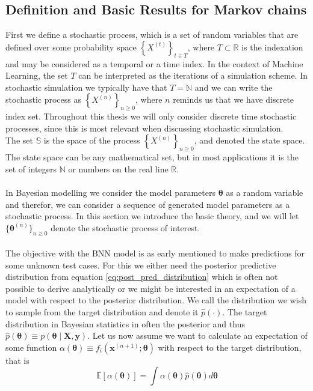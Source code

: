 \subsection{Definition and Basic Results for Markov chains}
First we define a stochastic process, which is a set of random variables that are defined over some probability space $\left\{X^{(t)} \right\}_{t\in T}$, where $T\subset \mathbb{R}$ is the indexation and may be considered as a temporal or a time index. In the context of Machine Learning, the set $T$ can be interpreted as the iterations of a simulation scheme. In stochastic simulation we typically have that $T=\mathbb{N}$ and we can write the stochastic process as $\left\{X^{(n)}\right\}_{n\geq 0}$, where $n$ reminds us that we have discrete index set. Throughout this thesis we will only consider discrete time stochastic processes, since this is most relevant when discussing stochastic simulation. \\
The set $\mathbb{S}$ is the space of the process $\left\{X^{(n)} \right\}_{n\geq 0}$, and denoted the state space. The state space can be any mathematical set, but in most applications it is the set of integers $\mathbb{N}$ or numbers on the real line $\mathbb{R}$.\\
\\
In Bayesian modelling we consider the model parameters $\boldsymbol{\theta}$ as a random variable and therefor, we can consider a sequence of generated model parameters as a stochastic process. In this section we introduce the basic theory, and we will let $\{\boldsymbol{\theta}^{(n)}\}_{n\geq 0}$ denote the stochastic process of interest.\\ \\
The objective with the BNN model is as early mentioned to make predictions for some unknown test cases. For this we either need the posterior predictive distribution from equation \ref{eq:post_pred_distribution} which is often not possible to derive analytically or we might be interested in an expectation of a model with respect to the posterior distribution.
We call the distribution we wish to sample from the target distribution and denote it $\hat{p}(\cdot)$. The target distribution in Bayesian statistics in often the posterior and thus $\hat{p}(\boldsymbol{\theta})\equiv p(\boldsymbol{\theta}\mid \mathbf{X},\mathbf{y})$. Let us now assume we want to calculate an expectation of some function $\alpha(\boldsymbol{\theta})\equiv f_i(\mathbf{x}^{(n+1)};\boldsymbol{\theta})$ with respect to the target distribution, that is
\begin{equation}\label{eq: expectation_under_posterior}
    \mathbb{E}\left[\alpha(\boldsymbol{\theta})\right]=\int \alpha(\boldsymbol{\theta})\hat{p}(\boldsymbol{\theta}) d\boldsymbol{\theta}
\end{equation}
